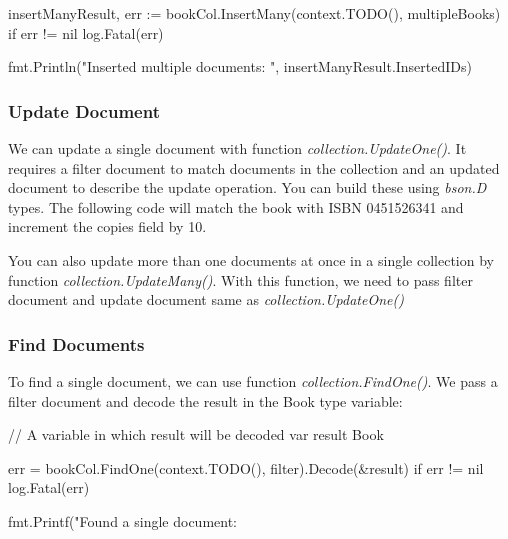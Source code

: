 \documentclass[12pt]{article}
\begin{document}
\begin{bashcode}
\begin{bashcode}
\begin{golangcode}
insertManyResult, err := bookCol.InsertMany(context.TODO(), multipleBooks)
if err != nil {
    log.Fatal(err)
}

fmt.Println("Inserted multiple documents: ", insertManyResult.InsertedIDs)
\end{golangcode}

\subsubsection{Update Document}

We can update a single document with function
\emph{collection.UpdateOne()}. It requires a filter document to match
documents in the collection and an updated document to describe the
update operation. You can build these using \emph{bson.D} types. The
following code will match the book with ISBN 0451526341 and increment
the copies field by 10.


You can also update more than one documents at once in a single
collection by function \emph{collection.UpdateMany()}. With this
function, we need to pass filter document and update document same as
\emph{collection.UpdateOne()}

\subsubsection{Find Documents}

To find a single document, we can use function
\emph{collection.FindOne()}. We
pass a filter document and decode the result in the Book type
variable:

\begin{golangcode}
// A variable in which result will be decoded
var result Book

err = bookCol.FindOne(context.TODO(), filter).Decode(&result)
if err != nil {
    log.Fatal(err)
}

fmt.Printf("Found a single document: %
\end{golangcode}


\end{bashcode}
\end{bashcode}
\end{document}
